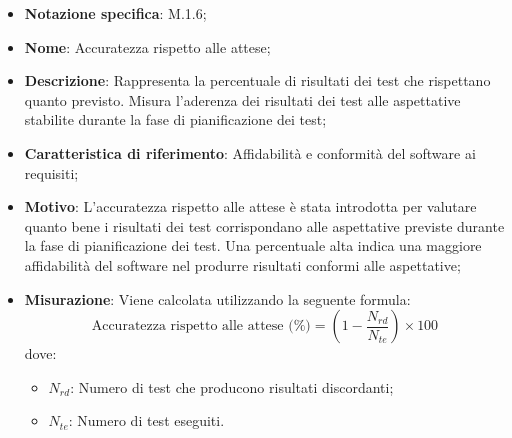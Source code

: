 \begin{itemize}
    \item \textbf{Notazione specifica}: M.1.6;
    \item \textbf{Nome}: Accuratezza rispetto alle attese;
    \item \textbf{Descrizione}: Rappresenta la percentuale di risultati dei test che rispettano quanto previsto. Misura l'aderenza dei risultati dei test alle aspettative stabilite durante la fase di pianificazione dei test;
    \item \textbf{Caratteristica di riferimento}: Affidabilità e conformità del software ai requisiti;
    \item \textbf{Motivo}: L'accuratezza rispetto alle attese è stata introdotta per valutare quanto bene i risultati dei test corrispondano alle aspettative previste durante la fase di pianificazione dei test. Una percentuale alta indica una maggiore affidabilità del software nel produrre risultati conformi alle aspettative;
    \item \textbf{Misurazione}: Viene calcolata utilizzando la seguente formula:
    \[
    \text{Accuratezza rispetto alle attese (\%)} = \left(1 - \frac{N_{rd}}{N_{te}}\right) \times 100
    \]
    dove:
    \begin{itemize}
        \item $N_{rd}$: Numero di test che producono risultati discordanti;
        \item $N_{te}$: Numero di test eseguiti.
    \end{itemize} 
\end{itemize}
